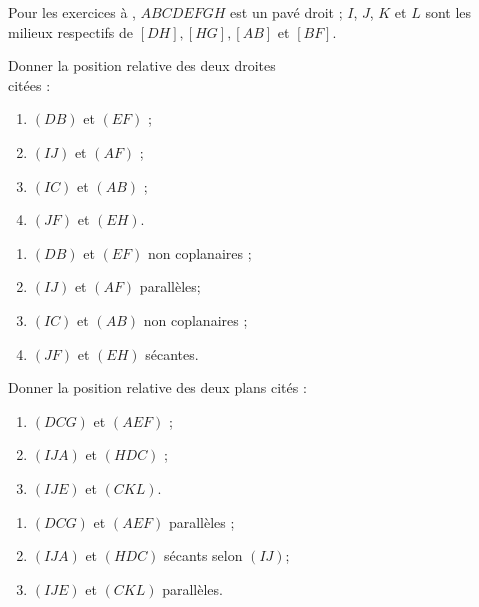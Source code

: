\documentclass{cornouaille}
\begin{document}
\exercicesbase

\begin{colonne*exercice}


Pour les exercices  à ,
$ABCDEFGH$ est un pavé droit ; $I$, $J$, $K$ et $L$ sont les milieux
respectifs de $[DH], [HG], [AB]$ et $[BF]$.

\begin{center}
  
\end{center}

\begin{exercice*}\label{G2Exo1}
Donner la position relative des deux droites\\ citées : 
\begin{enumerate}
\item $(DB)$ et $(EF)$ ;
\item $(IJ)$ et $(AF)$ ;
\item $(IC)$ et $(AB)$ ;
\item $(JF)$ et $(EH)$.
\end{enumerate}
\end{exercice*}
\begin{corrige}
  \begin{enumerate}
\item $(DB)$ et $(EF)$ non coplanaires ;
\item $(IJ)$ et $(AF)$ parallèles;
\item $(IC)$ et $(AB)$ non coplanaires ;
\item $(JF)$ et $(EH)$ sécantes.
\end{enumerate}
\end{corrige}

\begin{exercice*}
  Donner la position relative des deux plans cités :
  \begin{enumerate}
  \item $(DCG)$ et $(AEF)$ ;
  \item $(IJA)$ et $(HDC)$ ;
  \item $(IJE)$ et $(CKL)$.
  \end{enumerate}
\end{exercice*}
\begin{corrige}
  \begin{enumerate}
\item $(DCG)$ et $(AEF)$ parallèles ;
\item $(IJA)$ et $(HDC)$ sécants selon $(IJ)$;
\item $(IJE)$ et $(CKL)$ parallèles.
\end{enumerate}
\end{corrige}


\end{colonne*exercice}
\end{document}
